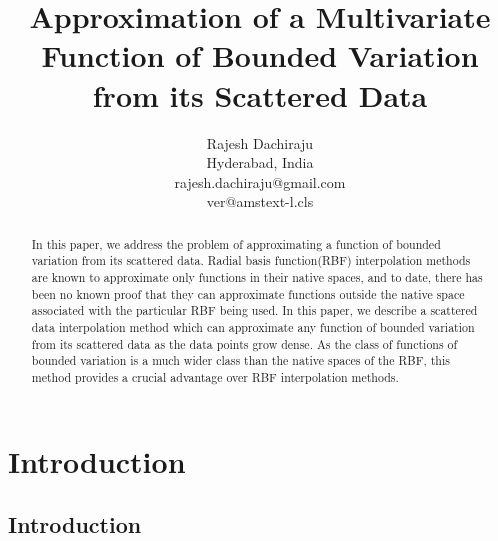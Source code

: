 \documentclass[multixcb]{amstext-l}
\theoremstyle{plain}
\theoremstyle{definition}
\theoremstyle{definition}
\theoremstyle{remark}
\numberwithin{equation}{chapter}
\begin{document}
\frontmatter

\makeatletter
\def\currversion{\csname ver@amstext-l.cls\endcsname}
\makeatother

\title{Approximation of a Multivariate Function of Bounded Variation from its Scattered Data}
\author{Rajesh Dachiraju\\Hyderabad, India\\rajesh.dachiraju@gmail.com\\[12pt]
        \smaller \currversion}

\maketitle
\begin{abstract}
    In this paper, we address the problem of approximating a function of bounded variation from its scattered data. Radial basis function(RBF) interpolation methods are known to approximate only functions in their native spaces, and to date, there has been no known proof that they can approximate functions outside the native space associated with the particular RBF being used. In this paper, we describe a scattered data interpolation method which can approximate any function of bounded variation from its scattered data as the data points grow dense. As the class of functions of bounded variation is a much wider class than the native spaces of the RBF, this method provides a crucial advantage over RBF interpolation methods.
\end{abstract}
\tableofcontents

\mainmatter

\chapter{Introduction}\label{Intro_chap}

\section{Introduction}
\end{document}
